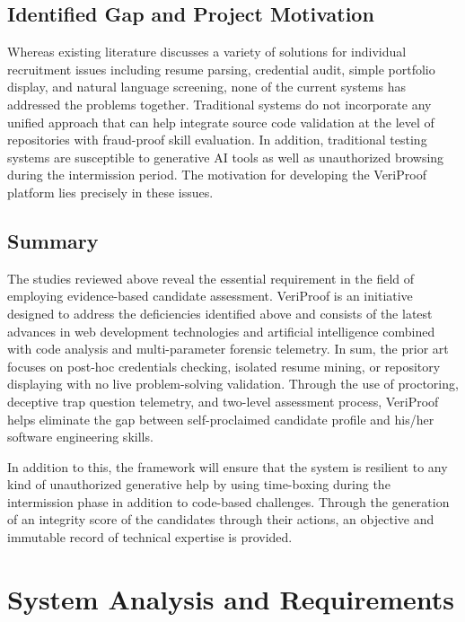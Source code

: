 \section{Identified Gap and Project Motivation}
Whereas existing literature discusses a variety of solutions for individual recruitment issues including resume parsing, credential audit, simple portfolio display, and natural language screening, none of the current systems has addressed the problems together. Traditional systems do not incorporate any unified approach that can help integrate source code validation at the level of repositories with fraud-proof skill evaluation. In addition, traditional testing systems are susceptible to generative AI tools as well as unauthorized browsing during the intermission period. The motivation for developing the VeriProof platform lies precisely in these issues.

\section{Summary}
The studies reviewed above reveal the essential requirement in the field of employing evidence-based candidate assessment. VeriProof is an initiative designed to address the deficiencies identified above and consists of the latest advances in web development technologies and artificial intelligence combined with code analysis and multi-parameter forensic telemetry. In sum, the prior art focuses on post-hoc credentials checking, isolated resume mining, or repository displaying with no live problem-solving validation. Through the use of proctoring, deceptive trap question telemetry, and two-level assessment process, VeriProof helps eliminate the gap between self-proclaimed candidate profile and his/her software engineering skills.

In addition to this, the framework will ensure that the system is resilient to any kind of unauthorized generative help by using time-boxing during the intermission phase in addition to code-based challenges. Through the generation of an integrity score of the candidates through their actions, an objective and immutable record of technical expertise is provided.
\clearpage


\chapter{System Analysis and Requirements}

